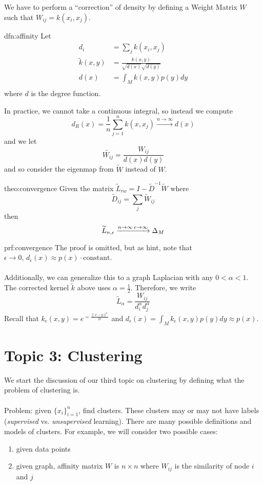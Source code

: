 \documentclass[12pt]{article}
\begin{document}
We have to perform a ``correction'' of density by defining a Weight Matrix $ W $ such that $ W_{ij} = k(x_i, x_j) $.
\newpage
\begin{dfn}{dfn:affinity}
	Let
	\begin{align*}
		d_i &= \sum_{j} k(x_i, x_j) \\
		\widetilde{k} (x, y) &= \frac{k(x, y)}{\sqrt{d(x)} \sqrt{d(y)}} \\
		d(x) &= \int_M k(x, y) p(y) dy \\
	\end{align*}
	where $ d $ is the degree function.
\end{dfn}
In practice, we cannot take a continuous integral, so instead we compute
\[
d_R (x) = \frac{1}{n} \sum_{j = 1}^n k(x, x_j) \xrightarrow{n \to \infty} d(x)
\]
and we let
\[
\widetilde{W_{ij}} = \frac{W_{ij}}{d(x) d(y)}
\]
and so consider the eigenmap from $ \widetilde{W} $ instead of $ W $.
\begin{theo}{theo:convergence}
	Given the matrix $ \widetilde{L}_{rw} = I - \widetilde{D}^{-1} \widetilde{W} $ where
	\[
	\widetilde{D}_{ij} = \sum_j \widetilde{W}_{ij}
	\]
	then
	\[
	\widetilde{L}_{n, \epsilon} \xrightarrow{n \to \infty \\ \epsilon \to \infty} \Delta_M
	\]
\end{theo}
\begin{prf}{prf:convergence}
	The proof is omitted, but as hint, note that $ \epsilon \to 0, \, d_{\epsilon} (x) \approx p(x) \cdot \text{constant} $.
	\\ \\
	Additionally, we can generalize this to a graph Laplacian with any $ 0 < \alpha < 1 $.
	The corrected kernel $\widetilde{k}$ above uses $\alpha = \frac{1}{2}$.
	Therefore, we write
	\[
	\widetilde{L}_{\alpha} = \frac{W_{ij}}{d_i^{\alpha} d_j^{\alpha}}
	\]
	Recall that $k_{\epsilon} (x, y) = e^{= \frac{\| x - y \|^2}{2 \epsilon}}$ and $d_{\epsilon} (x) = \int_M k_{\epsilon} (x, y) p(y) dy \approx p(x)$.
\end{prf}

\section{Topic 3: Clustering}
We start the discussion of our third topic on clustering by defining what the problem of clustering is.
\\ \\
Problem: given $ \{ x_i \}_{i = 1}^n $, find clusters.
These clusters may or may not have labels (\textit{supervised} vs. \textit{unsupervised} learning).
There are many possible definitions and models of clusters.
For example, we will consider two possible cases:
\begin{enumerate}
    \item given data points
    \item given graph, affinity matrix $W $ is $ n \times n $ where $ W_{ij} $ is the similarity of node $ i $ and $ j $
\end{enumerate}
\end{document}
